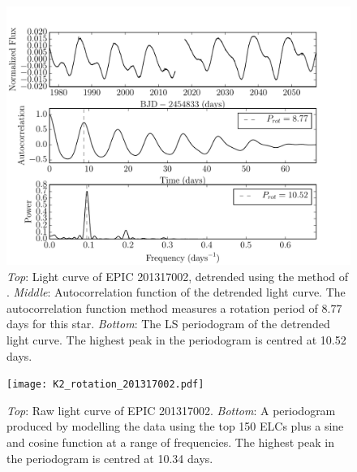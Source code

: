 \documentclass[useAMS, usenatbib, preprint, 12pt]{aastex}
\begin{document}
\begin{figure}
\begin{center}
\includegraphics[width=6in, clip=true]{rotation_poster_child.pdf}
\caption{{\it Top}: Light curve of EPIC 201317002, detrended using the method
of \citet{Vanderburg2014}. {\it Middle}: Autocorrelation function of the
detrended light curve. The autocorrelation function method measures a rotation
period of 8.77 days for this star. {\it Bottom}: The LS periodogram
of the detrended light curve. The highest peak in the periodogram is centred at
10.52 days.}
\label{fig:rotation_poster_child}
\end{center}
\end{figure}

\begin{figure}
\begin{center}
\texttt{[image: K2\_rotation\_201317002.pdf]}
\caption{{\it Top}: Raw light curve of EPIC 201317002. {\it Bottom}: A
periodogram produced by modelling the data using the top 150 ELCs
plus a sine and cosine function at a range of frequencies. The highest peak in
the periodogram is centred at 10.34 days.}
\label{fig:K2_rotation_poster_child}
\end{center}
\end{figure}
\end{document}
